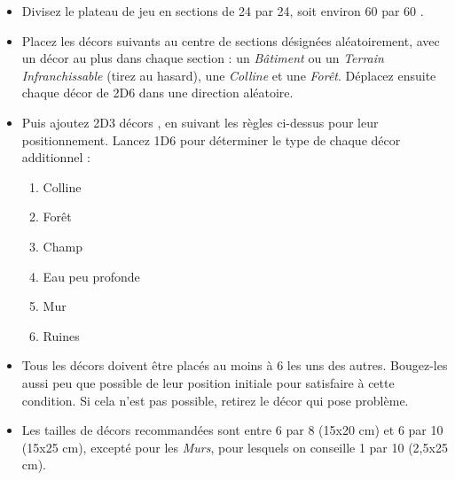 \begin{itemize}[label={-}]
\item Divisez le plateau de jeu en sections de 24{\pouce} par 24{\pouce}, soit environ 60 {\centi\meter} par 60 {\centi\meter} .

\item Placez les décors suivants au centre de sections désignées aléatoirement, avec un décor au plus dans chaque section : un \emph{Bâtiment} ou un \emph{Terrain Infranchissable} (tirez au hasard), une \emph{Colline} et une \emph{Forêt}. Déplacez ensuite chaque décor de 2D6{\pouce} dans une direction aléatoire.

\item Puis ajoutez 2D3 décors , en suivant les règles ci-dessus pour leur positionnement. Lancez 1D6 pour déterminer le type de chaque décor additionnel :
\begin{enumerate}
\item Colline
\item Forêt
\item Champ
\item Eau peu profonde
\item Mur
\item Ruines
\end{enumerate}

\item Tous les décors doivent être placés au moins à 6{\pouce} les uns des autres. Bougez-les aussi peu que possible de leur position initiale pour satisfaire à cette condition. Si cela n'est pas possible, retirez le décor qui pose problème.
\item Les tailles de décors recommandées sont entre 6{\pouce} par 8{\pouce} (15x20 cm) et 6{\pouce} par 10{\pouce} (15x25 cm), excepté pour les \emph{Murs}, pour lesquels on conseille 1{\pouce} par 10{\pouce} (2,5x25 cm).
\end{itemize}

\section[Type de déploiement]{}

